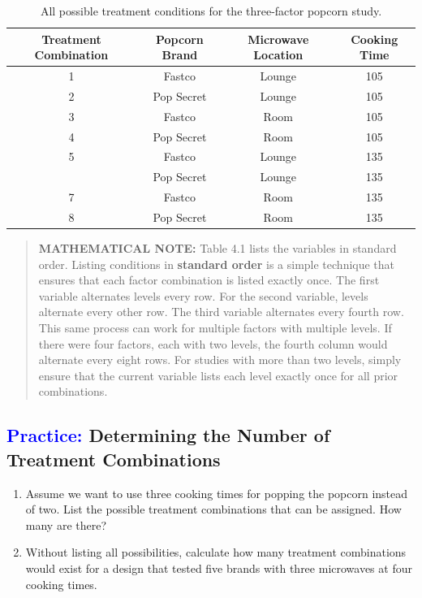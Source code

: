 \documentclass[
]{report}
\begin{document}
\begin{table}[!h]
\centering
\caption{\label{tab:tab41}All possible treatment conditions for the three-factor popcorn study.}
\centering
\begin{tabular}[t]{cccc}
\toprule
Treatment Combination & Popcorn Brand & Microwave Location & Cooking Time\\
\midrule
1 & Fastco & Lounge & 105\\
2 & Pop Secret & Lounge & 105\\
3 & Fastco & Room & 105\\
4 & Pop Secret & Room & 105\\
5 & Fastco & Lounge & 135\\
\addlinespace
6 & Pop Secret & Lounge & 135\\
7 & Fastco & Room & 135\\
8 & Pop Secret & Room & 135\\
\bottomrule
\end{tabular}
\end{table}

\begin{quote}
\textbf{MATHEMATICAL NOTE:} Table 4.1 lists the variables in standard order. Listing conditions in \textbf{standard order} is a simple technique that ensures that each factor combination is listed exactly once. The first variable alternates levels every row. For the second variable, levels alternate every other row. The third variable alternates every fourth row. This same process can work for multiple factors with multiple levels. If there were four factors, each with two levels, the fourth column would alternate every eight rows. For studies with more than two levels, simply ensure that the current variable lists each level exactly once for all prior combinations.
\end{quote}

\hypertarget{determining-the-number-of-treatment-combinations}{%
\subsection*{\texorpdfstring{\textcolor{blue}{Practice:} Determining the Number of Treatment Combinations}{ Determining the Number of Treatment Combinations}}\label{determining-the-number-of-treatment-combinations}}

\begin{enumerate}
\def\labelenumi{\arabic{enumi}.}
\item
  Assume we want to use three cooking times for popping the popcorn instead of two. List the possible treatment combinations that can be assigned. How many are there?
\item
  Without listing all possibilities, calculate how many treatment combinations would exist for a design that tested five brands with three microwaves at four cooking times.
\end{enumerate}
\end{document}
